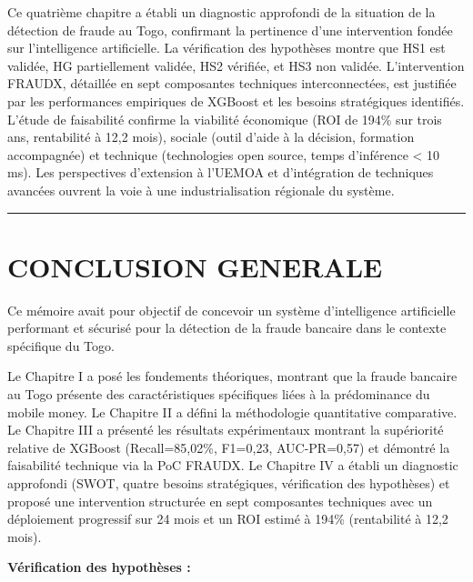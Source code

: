 \documentclass[
  12pt,
]{article}
\begin{document}
Ce quatrième chapitre a établi un diagnostic approfondi de la situation
de la détection de fraude au Togo, confirmant la pertinence d’une
intervention fondée sur l’intelligence artificielle. La vérification des
hypothèses montre que HS1 est validée, HG partiellement validée, HS2
vérifiée, et HS3 non validée. L’intervention FRAUDX, détaillée en sept
composantes techniques interconnectées, est justifiée par les
performances empiriques de XGBoost et les besoins stratégiques
identifiés. L’étude de faisabilité confirme la viabilité économique (ROI
de 194\% sur trois ans, rentabilité à 12,2 mois), sociale (outil d’aide
à la décision, formation accompagnée) et technique (technologies open
source, temps d’inférence \textless{} 10 ms). Les perspectives
d’extension à l’UEMOA et d’intégration de techniques avancées ouvrent la
voie à une industrialisation régionale du système.

\begin{center}\rule{0.5\linewidth}{0.5pt}\end{center}

\section{CONCLUSION GENERALE}\label{conclusion-generale}

Ce mémoire avait pour objectif de concevoir un système d’intelligence
artificielle performant et sécurisé pour la détection de la fraude
bancaire dans le contexte spécifique du Togo.

Le Chapitre I a posé les fondements théoriques, montrant que la fraude
bancaire au Togo présente des caractéristiques spécifiques liées à la
prédominance du mobile money. Le Chapitre II a défini la méthodologie
quantitative comparative. Le Chapitre III a présenté les résultats
expérimentaux montrant la supériorité relative de XGBoost
(Recall=85,02\%, F1=0,23, AUC-PR=0,57) et démontré la faisabilité
technique via la PoC FRAUDX. Le Chapitre IV a établi un diagnostic
approfondi (SWOT, quatre besoins stratégiques, vérification des
hypothèses) et proposé une intervention structurée en sept composantes
techniques avec un déploiement progressif sur 24 mois et un ROI estimé à
194\% (rentabilité à 12,2 mois).

\textbf{Vérification des hypothèses :}
\end{document}
